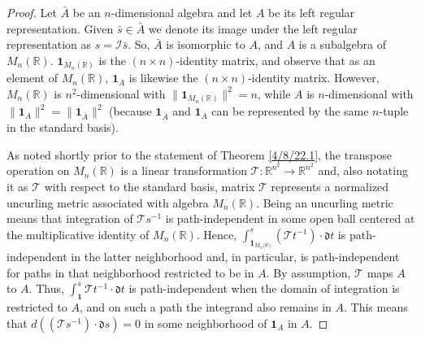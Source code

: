 \documentclass{amsart}
\numberwithin{equation}{section}
\theoremstyle{definition}
\numberwithin{theorem}{section}
\begin{document}
\begin{proof} 
Let $\bar{A}$ be an $n$-dimensional algebra and let $A$ be its left regular representation.  Given $\bar{s}\in\bar{A}$ we denote its image under the left regular representation as $s = \mathcal{I}\bar{s}$.
 So, $\bar{A}$ is isomorphic to $A$, and $A$ is a subalgebra of $ M_n(\mathbb{R})$.   $\mathbf{1}_{M_n(\mathbb{R})}$ is the $(n\times n)$-identity matrix, and observe that as an element of $ M_n(\mathbb{R})$, $\mathbf{1}_A$ is likewise the $(n\times n)$-identity matrix.  However, $ M_n(\mathbb{R})$ is $n^2$-dimensional with $\|\mathbf{1}_{M_n(\mathbb{R})}\|^2 = n$, while $A$ is $n$-dimensional with $\|\mathbf{1}_A\|^2 = \|\mathbf{1}_{\bar{A}}\|^2$ (because $\mathbf{1}_{\bar{A}}$ and  $\mathbf{1}_A$ can be represented by the same $n$-tuple in the standard basis).   

As noted shortly prior to the statement of Theorem \ref{4/8/22.1}, the transpose operation on $ M_n(\mathbb{R})$ is a linear transformation $\mathcal{\mathcal{T}}:\mathbb{R}^{n^2}\rightarrow \mathbb{R}^{n^2}$ and, also notating it as $\mathcal{\mathcal{T}}$ with respect to the standard basis, matrix $\mathcal{\mathcal{T}}$ represents a normalized uncurling metric associated with algebra  $ M_n(\mathbb{R})$.  Being an uncurling metric means that integration of $\mathcal{\mathcal{T}}s^{-1}$ is path-independent in some open ball centered at the multiplicative identity of $ M_n(\mathbb{R})$.  
 Hence, $\int_{\mathbf{1}_{M_n({\mathbb{R})}}}^s (\mathcal{\mathcal{T}}t^{-1})\cdot \mathfrak{d}t$ is path-independent in the latter neighborhood and, in particular, is path-independent for paths in that neighborhood restricted to be in $A$.  By assumption, $\mathcal{\mathcal{T}}$ maps $A$ to $A$. 
 Thus, $\int_\mathbf{1}^s \mathcal{\mathcal{T}}t^{-1}\cdot \mathfrak{d}t$ is path-independent when the domain of integration is restricted to $A$, and on such a path the integrand also remains in $A$.  This means that 
  $d((\mathcal{\mathcal{T}}s^{-1})\cdot \mathfrak{d}s) = 0$ in some neighborhood of $\mathbf{1}_A$ in $A$.
  

\end{proof}
\end{document}
